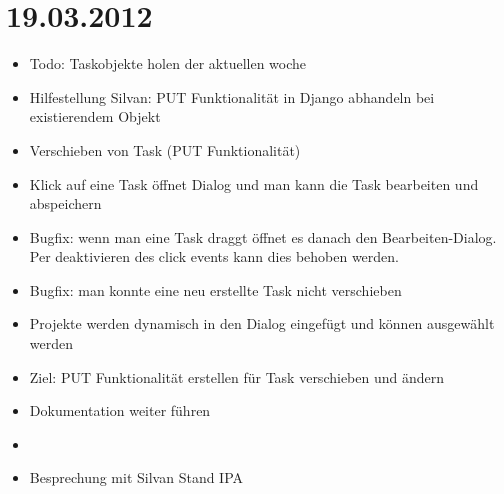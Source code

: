 \section{19.03.2012}
    \begin{itemize}
        \item Todo: Taskobjekte holen der aktuellen woche
        \item Hilfestellung Silvan: PUT Funktionalität in Django abhandeln bei existierendem Objekt
        \item Verschieben von Task (PUT Funktionalität)
        \item Klick auf eine Task öffnet Dialog und man kann die Task bearbeiten und abspeichern
        \item Bugfix: wenn man eine Task draggt öffnet es danach den Bearbeiten-Dialog. Per deaktivieren des click events kann dies behoben werden.
        \item Bugfix: man konnte eine neu erstellte Task nicht verschieben
        \item Projekte werden dynamisch in den Dialog eingefügt und können ausgewählt werden
        \item Ziel: PUT Funktionalität erstellen für Task verschieben und ändern
        \item Dokumentation weiter führen
        \item 
        \item Besprechung mit Silvan Stand IPA
    \end{itemize}
